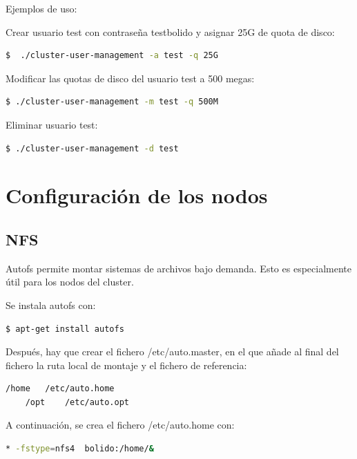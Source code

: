 Ejemplos de uso:
\vspace{4mm} 

Crear usuario test con contraseña testbolido y asignar 25G de quota de disco:
\begin{lstlisting}[language=bash]
    $  ./cluster-user-management -a test -q 25G
\end{lstlisting}
\vspace{4mm} 

Modificar las quotas de disco del usuario test a 500 megas:

\begin{lstlisting}[language=bash]
    $ ./cluster-user-management -m test -q 500M
\end{lstlisting}
\vspace{4mm} 

Eliminar usuario test:
\begin{lstlisting}[language=bash]
    $ ./cluster-user-management -d test
\end{lstlisting}
 
\section{Configuración de los nodos}
\subsection{NFS}

Autofs permite montar sistemas de archivos bajo demanda. Esto es especialmente útil para los nodos del cluster. 
\vspace{2mm}

Se instala autofs con:
\vspace{2mm}
\begin{lstlisting}[language=bash]
    $ apt-get install autofs
\end{lstlisting}
\vspace{4mm}
Después, hay que crear el fichero /etc/auto.master, en el que añade al final del fichero la ruta local de montaje y el fichero de referencia:

\vspace{4mm}
\begin{lstlisting}[language=bash]
    /home   /etc/auto.home
    /opt    /etc/auto.opt
\end{lstlisting}
\vspace{4mm}

A continuación, se crea el fichero /etc/auto.home con:

\begin{lstlisting}[language=bash]
    * -fstype=nfs4  bolido:/home/&
\end{lstlisting}
\vspace{4mm}

